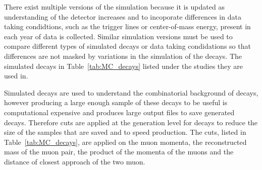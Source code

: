 There exist multiple versions of the simulation because it is updated as understanding of the detector increases and to incoporate differences in data taking condidtions, such as the trigger lines or center-of-mass energy, present in each year of data is collected. Similar simulation versions must be used to compare different types of simulated decays or data taking condidations so that differences are not masked by variations in the simulation of the decays. The simulated decays in Table~\ref{tab:MC_decays} listed under the studies they are used in. 

Simulated \bbbarmumux decays are used to understand the combinatorial background of \bsmumu decays, however producing a large enough sample of these decays to be useful is computational expensive and produces large output files to save generated decays. Therefore cuts are applied at the generation level for \bbbarmumux decays to reduce the size of the samples that are saved and to speed production. The cuts, listed in Table~\ref{tab:MC_decays}, are applied on the muon momenta, the reconstructed mass of the muon pair, the product of the momenta of the muons and the distance of closest approach of the two muon. %
  

